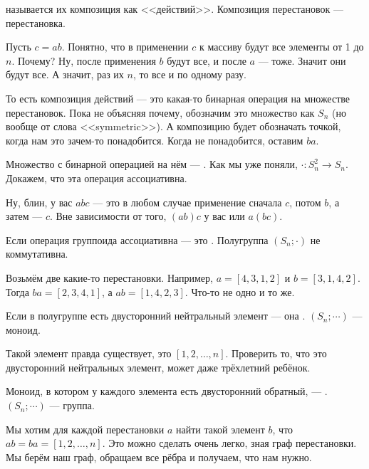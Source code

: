 \documentclass{article}
\begin{document}
\begin{itemize}
\begin{Comment}
        \end{Comment}
        \dfn {} называется их композиция как <<действий>>.
        \thm Композиция перестановок --- перестановка.
        \begin{Proof}
            Пусть $c=ab$. Понятно, что в применении $c$ к массиву будут все элементы от 1 до $n$. Почему? Ну, после применения $b$ будут все, и после $a$ --- тоже. Значит они будут все. А значит, раз их $n$, то все и по одному разу.
        \end{Proof}
        \begin{Comment}
            То есть композиция действий --- это какая-то бинарная операция на множестве перестановок. Пока не объясняя почему, обозначим это множество как $S_n$ (но вообще от слова <<symmetric>>). А композицию будет обозначать точкой, когда нам это зачем-то понадобится. Когда не понадобится, оставим $ba$.
        \end{Comment}
        \dfn Множество с бинарной операцией на нём --- .
        \thm Как мы уже поняли, $\cdot\colon S_n^2\to S_n$. Докажем, что эта операция ассоциативна.
        \begin{Proof}
            Ну, блин, у вас $abc$ --- это в любом случае применение сначала $c$, потом $b$, а затем --- $c$. Вне зависимости от того, $(ab)c$ у вас или $a(bc)$.
        \end{Proof}
        \dfn Если операция группоида ассоциативна --- это .
        \thm Полугруппа $(S_n;\cdot)$ не коммутативна.
        \begin{Proof}
            Возьмём две какие-то перестановки. Например, $a=[4,3,1,2]$ и $b=[3,1,4,2]$. Тогда $ba=[2,3,4,1]$, а $ab=[1,4,2,3]$. Что-то не одно и то же.
        \end{Proof}
        \dfn Если в полугруппе есть двусторонний нейтральный элемент --- она .
        \thm $(S_n;\cdots)$ --- моноид.
        \begin{Proof}
            Такой элемент правда существует, это $[1,2,\ldots,n]$. Проверить то, что это двусторонний нейтральных элемент, может даже трёхлетний ребёнок.
        \end{Proof}
        \dfn Моноид, в котором у каждого элемента есть двусторонний обратный, --- .
        \thm $(S_n;\cdots)$ --- группа.
        \begin{Proof}
            Мы хотим для каждой перестановки $a$ найти такой элемент $b$, что $ab=ba=[1,2,\ldots,n]$. Это можно сделать очень легко, зная граф перестановки. Мы берём наш граф, обращаем все рёбра и получаем, что нам нужно.

\end{Proof}
\end{itemize}
\end{document}
